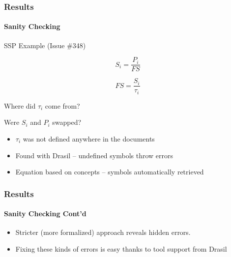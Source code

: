 \documentclass{beamer}
\begin{document}

\begin{frame}[fragile]

\frametitle{Results} %
\framesubtitle{Sanity Checking}

SSP Example (Issue \#348)

\begin{minipage}{.4\linewidth}
\begin{equation}
S_i = \frac{P_i}{FS}
\end{equation}
\end{minipage}%
\begin{minipage}{.4\linewidth}
\begin{equation}
FS = \frac{S_i}{\tau{}_i}
\end{equation}
\end{minipage}

\vspace{.5cm}Where did $\tau{}_i$ come from?\vspace{.3cm}

Were $S_i$ and $P_i$ swapped?


\begin{itemize}
\item $\tau{}_i$ was not defined anywhere in the documents
\item Found with Drasil -- undefined symbols throw errors
\item Equation based on concepts -- symbols automatically retrieved
\end{itemize}


\end{frame}


\begin{frame}[fragile]

\frametitle{Results} %
\framesubtitle{Sanity Checking Cont'd}

\begin{itemize}
\item Stricter (more formalized) approach reveals hidden errors.

\item Fixing these kinds of errors is easy thanks to tool support from Drasil
\end{itemize}

\end{frame}
\end{document}

